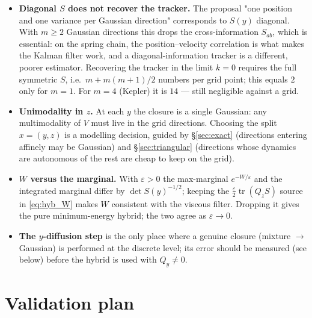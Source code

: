 \documentclass[11pt,a4paper]{article}
\newcommand{\tr}{\operatorname{tr}}
\newcommand{\eps}{\varepsilon}
\theoremstyle{plain}
\theoremstyle{definition}
\theoremstyle{remark}
\begin{document}
\begin{itemize}[leftmargin=1.5em]
  \item \textbf{Diagonal $S$ does not recover the tracker.} The proposal "one position and one variance per Gaussian direction" corresponds to $S(y)$ diagonal. With $m\ge2$ Gaussian directions this drops the cross-information $S_{ab}$, which is essential: on the spring chain, the position--velocity correlation is what makes the Kalman filter work, and a diagonal-information tracker is a different, poorer estimator. Recovering the tracker in the limit $k=0$ requires the full symmetric $S$, i.e.\ $m + m(m+1)/2$ numbers per grid point; this equals $2$ only for $m=1$. For $m=4$ (Kepler) it is $14$ --- still negligible against a grid.
  \item \textbf{Unimodality in $z$.} At each $y$ the closure is a single Gaussian: any multimodality of $V$ must live in the grid directions. Choosing the split $x=(y,z)$ is a modelling decision, guided by \S\ref{sec:exact} (directions entering affinely may be Gaussian) and \S\ref{sec:triangular} (directions whose dynamics are autonomous of the rest are cheap to keep on the grid).
  \item \textbf{$W$ versus the marginal.} With $\eps>0$ the max-marginal $e^{-W/\eps}$ and the integrated marginal differ by $\det S(y)^{-1/2}$; keeping the $\tfrac{\eps}{2}\tr(Q_zS)$ source in \eqref{eq:hyb_W} makes $W$ consistent with the viscous filter. Dropping it gives the pure minimum-energy hybrid; the two agree as $\eps\to0$.
  \item \textbf{The $y$-diffusion step} is the only place where a genuine closure (mixture $\to$ Gaussian) is performed at the discrete level; its error should be measured (see below) before the hybrid is used with $Q_y\neq0$.
\end{itemize}

\section{Validation plan}
\end{document}
